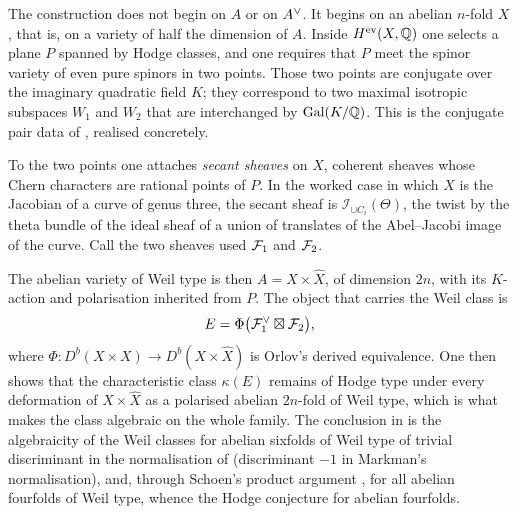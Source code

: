 The construction does not begin on $A$ or on $A^{\vee}$. It begins on an abelian
$n$-fold $X$, that is, on a variety of half the dimension of $A$. Inside
$H^{\mathrm{ev}}(X,\mathbb{Q})$ one selects a plane $P$ spanned by Hodge classes, and
one requires that $P$ meet the spinor variety of even pure spinors in two
points. Those two points are conjugate over the imaginary quadratic field $K$;
they correspond to two maximal isotropic subspaces $W_{1}$ and $W_{2}$ that are
interchanged by $\operatorname{Gal}(K/\mathbb{Q})$. This is the conjugate pair data of
, realised concretely.

To the two points one attaches \emph{secant sheaves} on $X$, coherent
sheaves whose Chern characters are rational points of $P$. In the worked case
in which $X$ is the Jacobian of a curve of genus three, the secant sheaf is
$\mathcal{I}_{\cup C_{i}}(\Theta)$, the twist by the theta bundle of the ideal
sheaf of a union of translates of the Abel--Jacobi image of the curve. Call the
two sheaves used $\mathcal{F}_{1}$ and $\mathcal{F}_{2}$.

The abelian variety of Weil type is then $A=X\times\widehat{X}$, of dimension
$2n$, with its $K$-action and polarisation inherited from $P$. The object that
carries the Weil class is
\begin{equation}\label{eq:markmanobject}
  E=\Phi\bigl(\mathcal{F}_{1}^{\vee}\boxtimes\mathcal{F}_{2}\bigr),
\end{equation}
where $\Phi\colon D^{b}(X\times X)\to D^{b}(X\times\widehat{X})$ is Orlov's
derived equivalence. One then shows that the characteristic class $\kappa(E)$
remains of Hodge type under every deformation of $X\times\widehat{X}$ as a
polarised abelian $2n$-fold of Weil type, which is what makes the class
algebraic on the whole family. The conclusion in \cite{Mar25b} is the
algebraicity of the Weil classes for abelian sixfolds of Weil type of trivial
discriminant in the normalisation of  (discriminant $-1$ in
Markman's normalisation), and, through Schoen's product argument
\cite[Proposition~10]{Sch98}, for all abelian fourfolds of Weil type, whence
the Hodge conjecture for abelian fourfolds.

